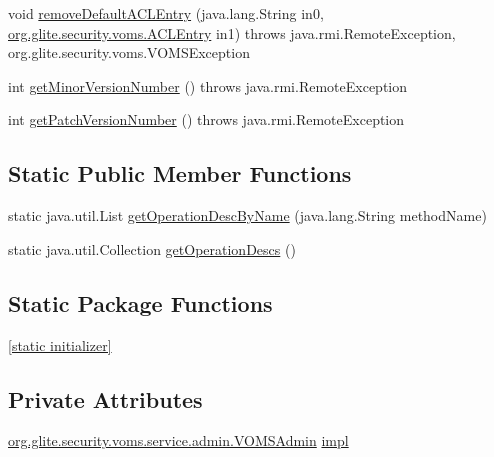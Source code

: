 \begin{DoxyCompactItemize}
\item 
void \hyperlink{classorg_1_1glite_1_1security_1_1voms_1_1service_1_1admin_1_1VOMSAdminSoapBindingSkeleton_acb9e6578ba0b56a7795f747441fd6889}{removeDefaultACLEntry} (java.lang.String in0, \hyperlink{classorg_1_1glite_1_1security_1_1voms_1_1ACLEntry}{org.glite.security.voms.ACLEntry} in1)  throws java.rmi.RemoteException, org.glite.security.voms.VOMSException     
\item 
int \hyperlink{classorg_1_1glite_1_1security_1_1voms_1_1service_1_1admin_1_1VOMSAdminSoapBindingSkeleton_a0101ed03ccc97daf00aca3dd6aa5de24}{getMinorVersionNumber} ()  throws java.rmi.RemoteException     
\item 
int \hyperlink{classorg_1_1glite_1_1security_1_1voms_1_1service_1_1admin_1_1VOMSAdminSoapBindingSkeleton_ac01af216f1e7f76d332709bffae94d87}{getPatchVersionNumber} ()  throws java.rmi.RemoteException     
\end{DoxyCompactItemize}
\subsection*{Static Public Member Functions}
\begin{DoxyCompactItemize}
\item 
static java.util.List \hyperlink{classorg_1_1glite_1_1security_1_1voms_1_1service_1_1admin_1_1VOMSAdminSoapBindingSkeleton_acdc8dec64d1d95d3afe0282fc7531007}{getOperationDescByName} (java.lang.String methodName)
\item 
static java.util.Collection \hyperlink{classorg_1_1glite_1_1security_1_1voms_1_1service_1_1admin_1_1VOMSAdminSoapBindingSkeleton_a62a8be1f90c9ed701c620c439ff19f51}{getOperationDescs} ()
\end{DoxyCompactItemize}
\subsection*{Static Package Functions}
\begin{DoxyCompactItemize}
\item 
\hyperlink{classorg_1_1glite_1_1security_1_1voms_1_1service_1_1admin_1_1VOMSAdminSoapBindingSkeleton_a2ceb218dd3a39e61675ebfe894913734}{\mbox{[}static initializer\mbox{]}}
\end{DoxyCompactItemize}
\subsection*{Private Attributes}
\begin{DoxyCompactItemize}
\item 
\hyperlink{interfaceorg_1_1glite_1_1security_1_1voms_1_1service_1_1admin_1_1VOMSAdmin}{org.glite.security.voms.service.admin.VOMSAdmin} \hyperlink{classorg_1_1glite_1_1security_1_1voms_1_1service_1_1admin_1_1VOMSAdminSoapBindingSkeleton_a25375d5138b17d662d53925796daaf74}{impl}
\end{DoxyCompactItemize}
